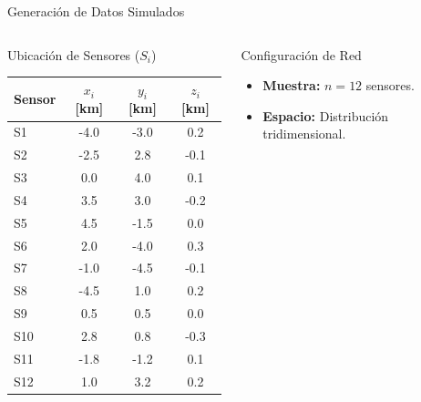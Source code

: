 

\begin{frame}{Generación de Datos Simulados}

    \begin{columns}[c]

        \begin{block}{Ubicación de Sensores ($S_i$)}
            \centering
            \scriptsize 
            \begin{tabular}{@{}lccc@{}}
                \toprule
                \textbf{Sensor} & \textbf{$x_i$ [km]} & \textbf{$y_i$ [km]} & \textbf{$z_i$ [km]} \\ \midrule
                S1 & -4.0 & -3.0 & 0.2 \\
                S2 & -2.5 & 2.8 & -0.1 \\
                S3 & 0.0 & 4.0 & 0.1 \\
                S4 & 3.5 & 3.0 & -0.2 \\
                S5 & 4.5 & -1.5 & 0.0 \\
                S6 & 2.0 & -4.0 & 0.3 \\
                S7 & -1.0 & -4.5 & -0.1 \\
                S8 & -4.5 & 1.0 & 0.2 \\
                S9 & 0.5 & 0.5 & 0.0 \\
                S10 & 2.8 & 0.8 & -0.3 \\
                S11 & -1.8 & -1.2 & 0.1 \\
                S12 & 1.0 & 3.2 & 0.2 \\ \bottomrule
            \end{tabular}
        \end{block}


        \begin{block}{Configuración de Red}
            \small
            \begin{itemize}
                \item \textbf{Muestra:} $n = 12$ sensores.
                \item \textbf{Espacio:} Distribución tridimensional.
            \end{itemize}
        \end{block}


\end{columns}
\end{frame}
